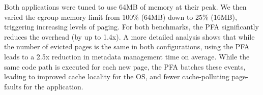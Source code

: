   Both applications were tuned to use 64MB of memory at their peak. We then
  varied the cgroup memory limit from 100\% (64MB) down to 25\% (16MB),
  triggering increasing levels of paging. For both benchmarks, the PFA
  significantly reduces the overhead (by up to 1.4x). A more detailed analysis
  shows that while the number of evicted pages is the same in both
  configurations, using the PFA leads to a 2.5x reduction in metadata
  management time on average. While the same code path is executed for each new
  page, the PFA batches these events, leading to improved cache locality for
  the OS, and fewer cache-polluting page-faults for the application.

